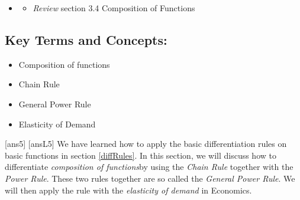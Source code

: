 \begin{framed}
\begin{itemize}
\item \cite{openstaxColAlgebra}\footnotemark[5]
    \begin{itemize}
        \item \emph{Review} section 3.4 Composition of Functions
    \end{itemize}

\end{itemize}
\subsection*{Key Terms and Concepts:} 

\begin{multicols}{2}
\begin{itemize}
    \item Composition of functions
    \item Chain Rule
    \item General Power Rule
    \item Elasticity of Demand 
\end{itemize}
\end{multicols}
\end{framed}
\newpage
[ans5]
[ansL5]
\noindent We have learned how to apply the basic differentiation rules on basic functions in section \ref{diffRules}. In this section, we will discuss how to differentiate \emph{composition of functions}\footnotemark[1] by using the \emph{Chain Rule} together with the \emph{Power Rule}. These two rules together are so called the \emph{General Power Rule}. We will then apply the rule with the \emph{elasticity of demand} in Economics.
